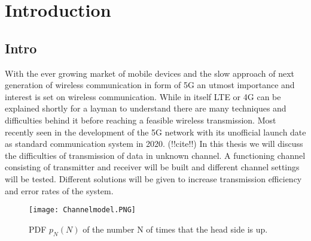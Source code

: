 \chapter{Introduction} \label{chap:intro}
\graphicspath{{C:/Users/Kevin/Bachelarbeit/Bachelorarbeit/01_Bachelorarbeit_LaTex/02_Figures/}}


\section{Intro}

With the ever growing market of mobile devices and the slow approach of next generation of wireless communication in form of 5G an utmost importance and interest is set on wireless communication. While in itself LTE or 4G can be explained shortly for a layman to understand there are many techniques and difficulties behind it before reaching a feasible wireless transmission. Most recently seen in the development of the 5G network with its unofficial launch date as standard communication system in 2020. (!!cite!!) In this thesis we will discuss the difficulties of transmission of data in unknown channel. A functioning channel consisting of transmitter and receiver will be built and different channel settings will be tested. Different solutions will be given to increase transmission efficiency and error rates of the system.




\begin{figure}[!htb]
    \centering
    \texttt{[image: Channelmodel.PNG]}
    \caption{PDF $p_N(N)$ of the number N of times that the head side is up.}
    \label{fig:coin_bino}
\end{figure}



\clearpage
